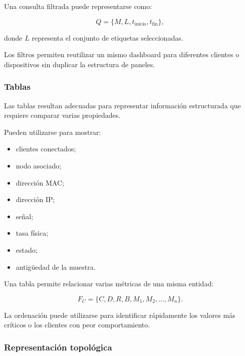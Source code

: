 Una consulta filtrada puede representarse como:

\[
    Q
    =
    \{
        M,
        L,
        t_{\mathrm{inicio}},
        t_{\mathrm{fin}}
    \},
\]

donde \(L\) representa el conjunto de etiquetas seleccionadas.

Los filtros permiten reutilizar un mismo dashboard para diferentes
clientes o dispositivos sin duplicar la estructura de paneles.


\subsubsection*{Tablas}

Las tablas resultan adecuadas para representar información estructurada
que requiere comparar varias propiedades.

Pueden utilizarse para mostrar:

\begin{itemize}
    \item clientes conectados;

    \item nodo asociado;

    \item dirección MAC;

    \item dirección IP;

    \item señal;

    \item tasa física;

    \item estado;

    \item antigüedad de la muestra.
\end{itemize}

Una tabla permite relacionar varias métricas de una misma entidad:

\[
    F_C
    =
    \{
        C,
        D,
        R,
        B,
        M_1,
        M_2,
        \ldots,
        M_n
    \}.
\]

La ordenación puede utilizarse para identificar rápidamente los valores
más críticos o los clientes con peor comportamiento.


\subsubsection*{Representación topológica}


